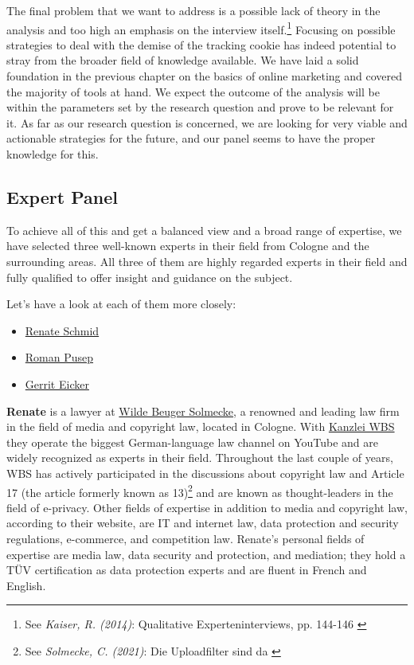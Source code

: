 The final problem that we want to address is a possible lack of theory in the analysis and too high an emphasis on the interview itself.\footnote{See \textit{Kaiser, R. (2014)}: Qualitative Experteninterviews, pp. 144-146 \cite{expertInterviews}} Focusing on possible strategies to deal with the demise of the tracking cookie has indeed potential to stray from the broader field of knowledge available. We have laid a solid foundation in the previous chapter on the basics of online marketing and covered the majority of tools at hand. We expect the outcome of the analysis will be within the parameters set by the research question and prove to be relevant for it. As far as our research question is concerned, we are looking for very viable and actionable strategies for the future, and our panel seems to have the proper knowledge for this.

\subsection{Expert Panel}

To achieve all of this and get a balanced view and a broad range of expertise, we have selected three well-known experts in their field from Cologne and the surrounding areas. All three of them are highly regarded experts in their field and fully qualified to offer insight and guidance on the subject.

Let's have a look at each of them more closely:

\begin{itemize}
 \item \href{https://www.linkedin.com/in/renate-schmid-535233113/}{Renate Schmid}
 \item \href{https://www.linkedin.com/in/roman-pusep-36b33374/}{Roman Pusep}
 \item \href{https://www.linkedin.com/in/eicker/}{Gerrit Eicker}
\end{itemize}

\textbf{Renate} is a lawyer at \href{https://www.wbs-law.de/}{Wilde Beuger Solmecke}, a renowned and leading law firm in the field of media and copyright law, located in Cologne. With \href{https://www.youtube.com/user/KanzleiWBS}{Kanzlei WBS} they operate the biggest German-language law channel on YouTube and are widely recognized as experts in their field. Throughout the last couple of years, WBS has actively participated in the discussions about copyright law and Article 17 (the article formerly known as 13)\footnote{See \textit{Solmecke, C. (2021)}: Die Uploadfilter sind da \cite{article17}} and are known as thought-leaders in the field of e-privacy. Other fields of expertise in addition to media and copyright law, according to their website, are IT and internet law, data protection and security regulations, e-commerce, and competition law. Renate's personal fields of expertise are media law, data security and protection, and mediation; they hold a TÜV certification as data protection experts and are fluent in French and English.

